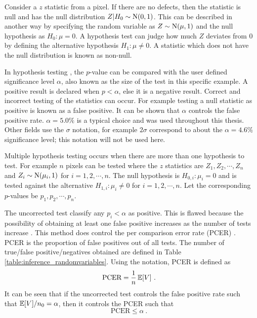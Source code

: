 Consider a $z$ statistic from a pixel. If there are no defects, then the statistic is null and has the null distribution $Z|H_0\sim\operatorname{N}(0,1)$. This can be described in another way by specifying the random variable as $Z\sim\operatorname{N}(\mu,1)$ and the null hypothesis as $H_0:\mu=0$. A hypothesis test can judge how much $Z$ deviates from 0 by defining the alternative hypothesis $H_1:\mu\neq 0$. A statistic which does not have the null distribution is known as non-null.

In hypothesis testing \cite{pearson1900on, neyman1933on, fisher1970statistical}, the $p$-value can be compared with the user defined significance level $\alpha$, also known as the size of the test in this specific example. A positive result is declared when $p<\alpha$, else it is a negative result. Correct and incorrect testing of the statistics can occur. For example testing a null statistic as positive is known as a false positive. It can be shown that $\alpha$ controls the false positive rate. $\alpha=5.0\%$ is a typical choice and was used throughout this thesis. Other fields use the $\sigma$ notation, for example $2\sigma$ correspond to about the $\alpha = 4.6\%$ significance level; this notation will not be used here.

Multiple hypothesis testing occurs when there are more than one hypothesis to test. For example $n$ pixels can be tested where the $z$ statistics are $Z_1, Z_2, \cdots, Z_n$ and $Z_i\sim\operatorname{N}(\mu_i,1)$ for $i=1,2,\cdots,n$. The null hypothesis is $H_{0,i}:\mu_i=0$ and is tested against the alternative $H_{1,i}:\mu_i\neq 0$ for $i=1,2,\cdots,n$. Let the corresponding $p$-values be $p_1, p_2, \cdots, p_n$.

The uncorrected test classify any $p_i<\alpha$ as positive. This is flawed because the possibility of obtaining at least one false positive increases as the number of tests increase \citep{shaffer1995multiple}. This method does control the per comparison error rate (PCER) \citep{benjamini1995controlling}. PCER is the proportion of false positives out of all tests. The number of true/false positive/negatives obtained are defined in Table \ref{table:inference_randomvariables}. Using the notation, PCER is defined as
\begin{equation}
  \text{PCER}=
  \dfrac{1}{n}
  \operatorname{\mathbb{E}}[V]
  \ .
\end{equation}
It can be seen that if the uncorrected test controls the false positive rate such that $\operatorname{\mathbb{E}}[V]/n_0 = \alpha$, then it controls the PCER such that
\begin{equation}
  \text{PCER}\leqslant\alpha \ .
\end{equation}


